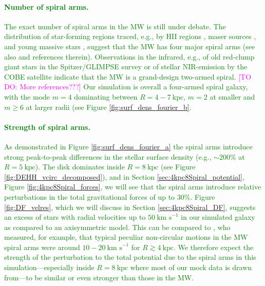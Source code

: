 \documentclass[iop,revtex4,numberedappendix,appendixfloats]{emulateapj}
\newcommand{\Wilma}[1]{\textcolor{Magenta}{#1}}
\newcommand{\NEW}[1]{\textcolor{Green}{#1}}
\begin{document}
\NEW{\paragraph{Number of spiral arms.}  The exact number of spiral arms in the MW is still under debate. The distribution of star-forming regions traced, e.g., by HII regions \citep{1976A&A....49...57G}, maser sources \citep{2009ApJ...700..137R,2014ApJ...783..130R}, and young massive stars \citep{2014MNRAS.437.1791U}, suggest that the MW has four major spiral arms (see also \citet{2008AJ....135.1301V,2014AJ....148....5V} and references therein). Observations in the infrared, e.g., of old red-clump giant stars  in the Spitzer/GLIMPSE survey \citep{2009PASP..121..213C} or of stellar NIR-emission by the COBE satellite \citep{2001ApJ...556..181D} indicate that the MW is a grand-design two-armed spiral. \Wilma{[TO DO: More references???]} Our simulation is overall a four-armed spiral galaxy, with the mode $m=4$ dominating between $R=4-7~\text{kpc}$, $m=2$ at smaller and $m\geq6$ at larger radii (see Figure \ref{fig:surf_dens_fourier_b}.} 

\NEW{\paragraph{Strength of spiral arms.} As demonstrated in Figure \ref{fig:surf_dens_fourier_a} the spiral arms introduce strong peak-to-peak differences in the stellar surface density (e.g., $\sim200\%$  at $R=5~\text{kpc}$). The disk dominates inside $R=8~\text{kpc}$ (see Figure \ref{fig:DEHH_vcirc_decomposed}), and in Section \ref{sec:4kpc8Spiral_potential}, Figure \ref{fig:4kpc8Spiral_forces}, we will see that the spiral arms introduce relative perturbations in the total gravitational forces of up to $30\%$. Figure \ref{fig:DF_velres}, which we will discuss in Section \ref{sec:4kpc8Spiral_DF}, suggests an excess of stars with radial velocities up to $50~\text{km s}^{-1}$ in our simulated galaxy as compared to an axisymmetric model. This can be compared to \citet{2014ApJ...783..130R}, who measured, for example, that typical peculiar non-circular motions in the MW spiral arms were around $10-20~\text{km s}^{-1}$ for $R \gtrsim 4~\text{kpc}$. We therefore expect the strength of the perturbation to the total potential due to the spiral arms in this simulation---especially inside $R=8~\text{kpc}$ where most of our mock data is drawn from---to be similar or even stronger than those in the MW.}

\end{document}
